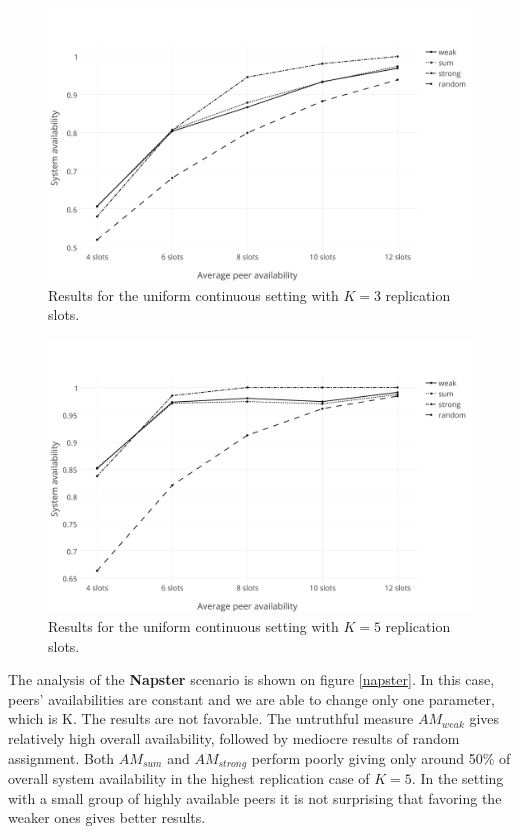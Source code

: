 \documentclass{pracamgren}
\begin{document}
\begin{figure}[h]
\centering
\includegraphics[scale=0.5]{graphs/uni_cont_3.pdf}
\caption{Results for the uniform continuous setting with $K=3$ replication slots.}
\label{uni_cont_3}
\end{figure}

\begin{figure}[h]
\centering
\includegraphics[scale=0.5]{graphs/uni_cont_5.pdf}
\caption{Results for the uniform continuous setting with $K=5$ replication slots.}
\label{uni_cont_5}
\end{figure}

The analysis of the {\bf Napster} scenario is shown on figure \ref{napster}. In this case, peers' availabilities are constant and we are able to change only one parameter, which is K. The results are not favorable. The untruthful measure $AM_{weak}$ gives relatively high overall availability, followed by mediocre results of random assignment. Both $AM_{sum}$ and $AM_{strong}$ perform poorly giving only around 50\% of overall system availability in the highest replication case of $K=5$. In the setting with a small group of highly available peers it is not surprising that favoring the weaker ones gives better results.\\
\end{document}
